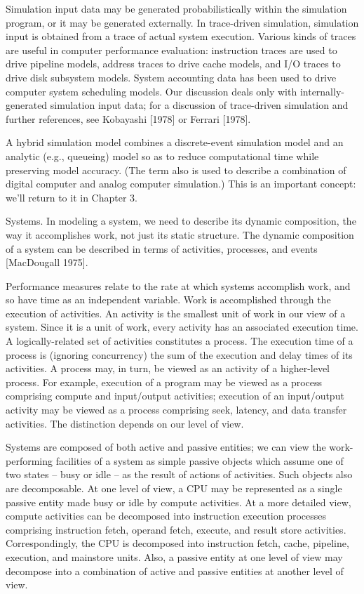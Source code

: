 Simulation input data may be generated probabilistically within the simulation
program, or it may be generated externally. In trace-driven simulation,
simulation input is obtained from a trace of actual system execution. Various
kinds of traces are useful in computer performance evaluation: instruction
traces are used to drive pipeline models, address traces to drive cache models,
and I/O traces to drive disk subsystem models. System accounting data has been
used to drive computer system scheduling models. Our discussion deals only with
internally-generated simulation input data; for a discussion of trace-driven
simulation and further references, see Kobayashi [1978] or Ferrari [1978].

A hybrid simulation model combines a discrete-event simulation model and an
analytic (e.g., queueing) model so as to reduce computational time while
preserving model accuracy. (The term also is used to describe a combination of
digital computer and analog computer simulation.) This is an important concept:
we'll return to it in Chapter 3.

Systems. In modeling a system, we need to describe its dynamic composition, the
way it accomplishes work, not just its static structure. The dynamic
composition of a system can be described in terms of activities, processes, and
events [MacDougall 1975].

Performance measures relate to the rate at which systems accomplish work, and
so have time as an independent variable. Work is accomplished through the
execution of activities. An activity is the smallest unit of work in our view
of a system. Since it is a unit of work, every activity has an associated
execution time. A logically-related set of activities constitutes a process.
The execution time of a process is (ignoring concurrency) the sum of the
execution and delay times of its activities. A process may, in turn, be viewed
as an activity of a higher-level process. For example, execution of a program
may be viewed as a process comprising compute and input/output activities;
execution of an input/output activity may be viewed as a process comprising
seek, latency, and data transfer activities. The distinction depends on our
level of view.

Systems are composed of both active and passive entities; we can view the
work-performing facilities of a system as simple passive objects which assume
one of two states -- busy or idle -- as the result of actions of activities.
Such objects also are decomposable. At one level of view, a CPU may be
represented as a single passive entity made busy or idle by compute activities.
At a more detailed view, compute activities can be decomposed into instruction
execution processes comprising instruction fetch, operand fetch, execute, and
result store activities. Correspondingly, the CPU is decomposed into
instruction fetch, cache, pipeline, execution, and mainstore units. Also, a
passive entity at one level of view may decompose into a combination of active
and passive entities at another level of view.

